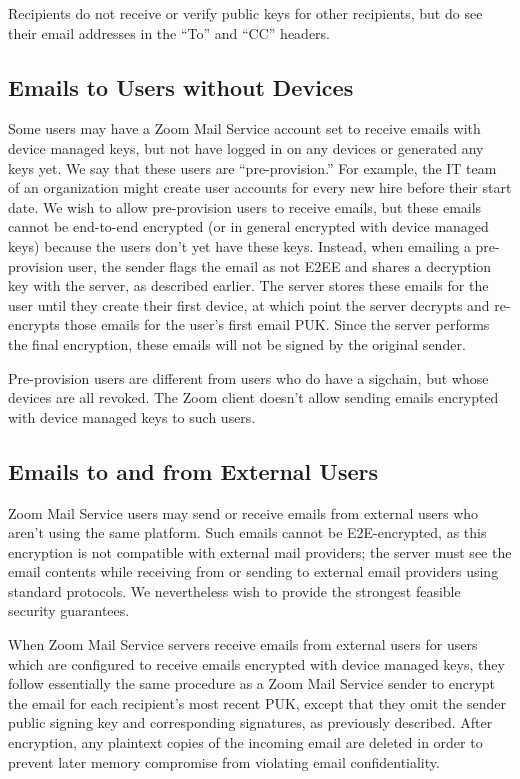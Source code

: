Recipients do not receive or verify public keys for other recipients, but do see their email
addresses in the ``To'' and ``CC'' headers.

\subsection{Emails to Users without Devices}

Some users may have a Zoom Mail Service account set to receive emails with device managed keys, but
not have logged in on any devices or generated any keys yet. We say that these users are
``pre-provision.'' For example, the IT team of an organization might create user accounts for every
new hire before their start date. We wish to allow pre-provision users to receive emails, but these
emails cannot be end-to-end encrypted (or in general encrypted with device managed keys) because the
users don't yet have these keys. Instead, when emailing a pre-provision user, the sender flags the
email as not E2EE and shares a decryption key with the server, as described earlier. The server
stores these emails for the user until they create their first device, at which point the server
decrypts and re-encrypts those emails for the user's first email PUK. Since the server performs the
final encryption, these emails will not be signed by the original sender.

Pre-provision users are different from users who do have a sigchain, but whose devices are all
revoked. The Zoom client doesn't allow sending emails encrypted with device managed keys to such
users.

\subsection{Emails to and from External Users}
\label{sec:mailext}

Zoom Mail Service users may send or receive emails from external users who aren't using the same
platform. Such emails cannot be E2E-encrypted, as this encryption is not compatible with external
mail providers; the server must see the email contents while receiving from or sending to external
email providers using standard protocols. We nevertheless wish to provide the strongest feasible
security guarantees.

When Zoom Mail Service servers receive emails from external users for users which are configured to
receive emails encrypted with device managed keys, they follow essentially the same procedure as a
Zoom Mail Service sender to encrypt the email for each recipient's most recent PUK, except that they
omit the sender public signing key and corresponding signatures, as previously described. After
encryption, any plaintext copies of the incoming email are deleted in order to prevent later memory
compromise from violating email confidentiality.

